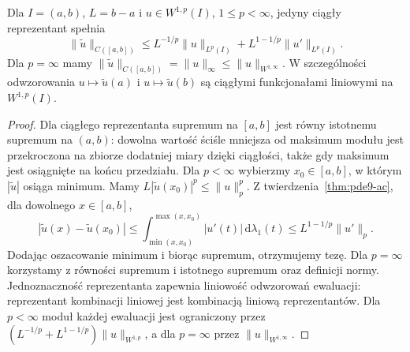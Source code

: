 \begin{wniosek}
\label{cor:pde9-trace-oneD}
Dla $I=(a,b)$, $L=b-a$ i $u\in W^{1,p}(I)$,
$1\le p<\infty$, jedyny ciągły reprezentant spełnia
\[
 \|\widetilde u\|_{C([a,b])}\le
 L^{-1/p}\|u\|_{L^p(I)}+L^{1-1/p}\|u'\|_{L^p(I)}.
\]
Dla $p=\infty$ mamy
$\|\widetilde u\|_{C([a,b])}=\|u\|_\infty
\le\|u\|_{W^{1,\infty}}$.
W szczególności odwzorowania $u\mapsto\widetilde u(a)$
i $u\mapsto\widetilde u(b)$ są ciągłymi funkcjonałami
liniowymi na $W^{1,p}(I)$.
\end{wniosek}
\begin{proof}
Dla ciągłego reprezentanta supremum na $[a,b]$ jest równy
istotnemu supremum na $(a,b)$: dowolna wartość
ściśle mniejsza od maksimum modułu jest przekroczona
na zbiorze dodatniej miary dzięki ciągłości, także gdy
maksimum jest osiągnięte na końcu przedziału.
Dla $p<\infty$ wybierzmy $x_0\in[a,b]$,
w którym $|\widetilde u|$ osiąga minimum.
Mamy $L|\widetilde u(x_0)|^p\le\|u\|_p^p$.
Z twierdzenia~\ref{thm:pde9-ac}, dla dowolnego $x\in[a,b]$,
\[
 |\widetilde u(x)-\widetilde u(x_0)|
 \le\int_{\min(x,x_0)}^{\max(x,x_0)}|u'(t)|
 \,\mathrm d\lambda_1(t)
 \le L^{1-1/p}\|u'\|_p.
\]
Dodając oszacowanie minimum i biorąc supremum,
otrzymujemy tezę. Dla $p=\infty$ korzystamy z równości
supremum i istotnego supremum oraz definicji normy.
Jednoznaczność reprezentanta zapewnia liniowość
odwzorowań ewaluacji: reprezentant kombinacji liniowej
jest kombinacją liniową reprezentantów.
Dla $p<\infty$ moduł każdej ewaluacji jest ograniczony
przez $(L^{-1/p}+L^{1-1/p})\|u\|_{W^{1,p}}$,
a dla $p=\infty$ przez $\|u\|_{W^{1,\infty}}$.
\end{proof}

